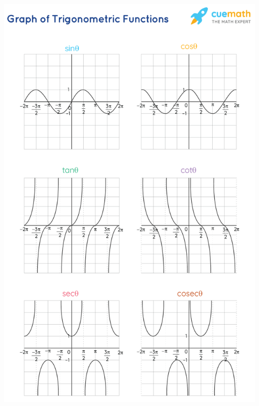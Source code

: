 \documentclass[8pt]{article}
\begin{document}
\begin{multicols*}{2}
\begin{minipage}{\linewidth-3cm}
      \includegraphics[width=\linewidth]{./media/trig_functions.png}
    \end{minipage}
\end{multicols*}
\end{document}
